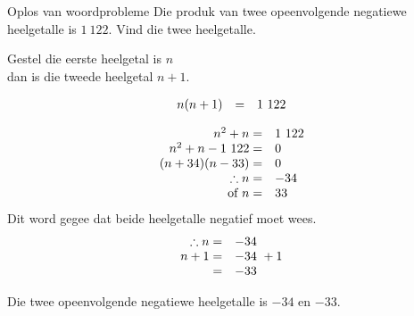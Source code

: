 \begin{wex}
{Oplos van woordprobleme}
{
Die produk van twee opeenvolgende negatiewe heelgetalle is $1~122$. Vind die twee heelgetalle.
\vspace*{-20pt}} 
{
Gestel die eerste heelgetal is $n$ 
\\dan is die tweede heelgetal $n+1$.\par 

\begin{equation*}
\begin{array}{cll}\hfill n(n+1)& =& 1~122\hfill \end{array}
\end{equation*}

\begin{equation*}
    \begin{array}{cll}
	\hfill n^{2} + n =& 1~122\hfill \\
\hfill n^{2} + n - 1~122 =& 0\hfill \\
\hfill (n+34)(n-33) =& 0\hfill \\
	\hfill \therefore  n =& -34 \hfill \\
\hfill \mbox{ of } n =& 33\hfill 
    \end{array}
\end{equation*}
Dit word gegee dat beide heelgetalle negatief moet wees.
\begin{equation*}
    \begin{array}{cll}
	\hfill \therefore n =& -34\hfill \\
\hfill n + 1 =& -34\ + 1 \hfill \\
\hfill  =& -33\hfill \\

    \end{array}
\end{equation*}

Die twee opeenvolgende negatiewe heelgetalle is $-34$ en $-33$.
}
\end{wex}

